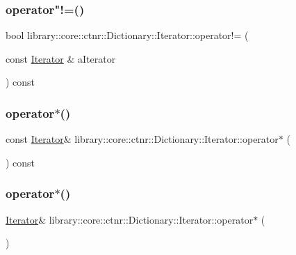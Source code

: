 \subsubsection{\texorpdfstring{operator"!=()}{operator!=()}}
{\footnotesize\ttfamily bool library\+::core\+::ctnr\+::\+Dictionary\+::\+Iterator\+::operator!= (\begin{DoxyParamCaption}\item[{const \hyperlink{classlibrary_1_1core_1_1ctnr_1_1Dictionary_1_1Iterator}{Iterator} \&}]{a\+Iterator }\end{DoxyParamCaption}) const}

\mbox{\label{classlibrary_1_1core_1_1ctnr_1_1Dictionary_1_1Iterator_ab162ab9f80c90a75c30d5c23b4343f11}} 
\subsubsection{\texorpdfstring{operator$\ast$()}{operator*()}\hspace{0.1cm}{\footnotesize\ttfamily [1/2]}}
{\footnotesize\ttfamily const \hyperlink{classlibrary_1_1core_1_1ctnr_1_1Dictionary_1_1Iterator}{Iterator}\& library\+::core\+::ctnr\+::\+Dictionary\+::\+Iterator\+::operator$\ast$ (\begin{DoxyParamCaption}{ }\end{DoxyParamCaption}) const}

\mbox{\label{classlibrary_1_1core_1_1ctnr_1_1Dictionary_1_1Iterator_a948d120f6e384f2567a000f356ff80b7}} 
\subsubsection{\texorpdfstring{operator$\ast$()}{operator*()}\hspace{0.1cm}{\footnotesize\ttfamily [2/2]}}
{\footnotesize\ttfamily \hyperlink{classlibrary_1_1core_1_1ctnr_1_1Dictionary_1_1Iterator}{Iterator}\& library\+::core\+::ctnr\+::\+Dictionary\+::\+Iterator\+::operator$\ast$ (\begin{DoxyParamCaption}{ }\end{DoxyParamCaption})}

